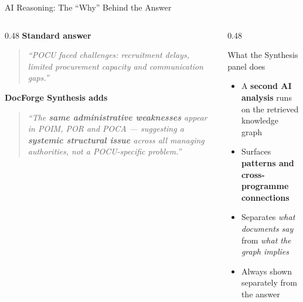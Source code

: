 \documentclass[aspectratio=169,11pt]{beamer}
\begin{document}
\begin{frame}{AI Reasoning: The ``Why'' Behind the Answer}
  \vspace{0.2cm}
  \begin{columns}[t]
    \begin{column}{0.48\textwidth}
      \textbf{Standard answer}\\[6pt]
      \begin{quote}\small\itshape
        ``POCU faced challenges: recruitment
         delays, limited procurement capacity
         and communication gaps.''
      \end{quote}
      \vspace{0.6em}
      \textbf{DocForge Synthesis adds}\\[6pt]
      \begin{quote}\small\itshape
        ``The \textbf{same administrative weaknesses}
         appear in POIM, POR and POCA — suggesting
         a \textbf{systemic structural issue}
         across all managing authorities,
         not a POCU-specific problem.''
      \end{quote}
    \end{column}
    \begin{column}{0.48\textwidth}
      \begin{block}{What the Synthesis panel does}
        \begin{itemize}\setlength\itemsep{7pt}
          \item A \textbf{second AI analysis} runs on
                the retrieved knowledge graph
          \item Surfaces \textbf{patterns and\\
                cross-programme connections}
          \item Separates \emph{what documents say}
                from \emph{what the graph implies}
          \item Always shown separately from the answer
        \end{itemize}
      \end{block}
    \end{column}
  \end{columns}
\end{frame}
\end{document}
